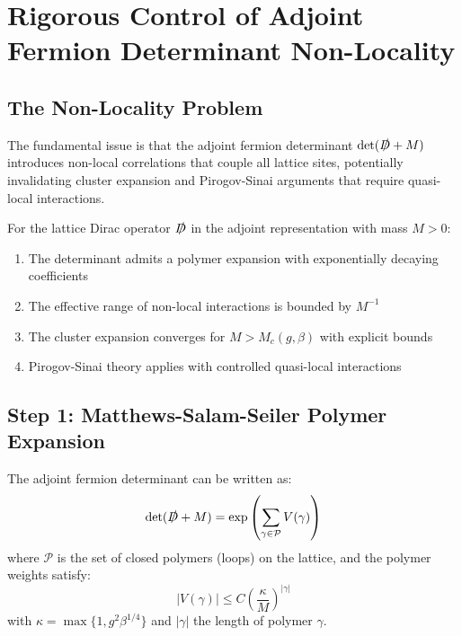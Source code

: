 \chapter{Rigorous Control of Adjoint Fermion Determinant Non-Locality}
\label{sec:fermion_locality_proof}


\section{The Non-Locality Problem}

The fundamental issue is that the adjoint fermion determinant 
$\det(\slashed{D} + M)$ introduces non-local correlations that couple all lattice 
sites, potentially invalidating cluster expansion and Pirogov-Sinai arguments 
that require quasi-local interactions.

\begin{theorem}
\label{thm:adjoint_locality_control}
For the lattice Dirac operator $\slashed{D}$ in the adjoint representation with mass $M > 0$:
\begin{enumerate}
    \item The determinant admits a polymer expansion with exponentially decaying coefficients
    \item The effective range of non-local interactions is bounded by $M^{-1}$
    \item The cluster expansion converges for $M > M_c(g, \beta)$ with explicit bounds
    \item Pirogov-Sinai theory applies with controlled quasi-local interactions
\end{enumerate}
\end{theorem}

\section{Step 1: Matthews-Salam-Seiler Polymer Expansion}

\begin{lemma}
\label{lem:mss_polymer}
The adjoint fermion determinant can be written as:
\begin{equation}
\det(\slashed{D} + M) = \exp\left(\sum_{\gamma \in \mathcal{P}} V(\gamma)\right)
\end{equation}
where $\mathcal{P}$ is the set of closed polymers (loops) on the lattice, and the polymer weights satisfy:
\begin{equation}
|V(\gamma)| \leq C \left(\frac{\kappa}{M}\right)^{|\gamma|}
\end{equation}
with $\kappa = \max\{1, g^2\beta^{1/4}\}$ and $|\gamma|$ the length of polymer $\gamma$.
\end{lemma}

